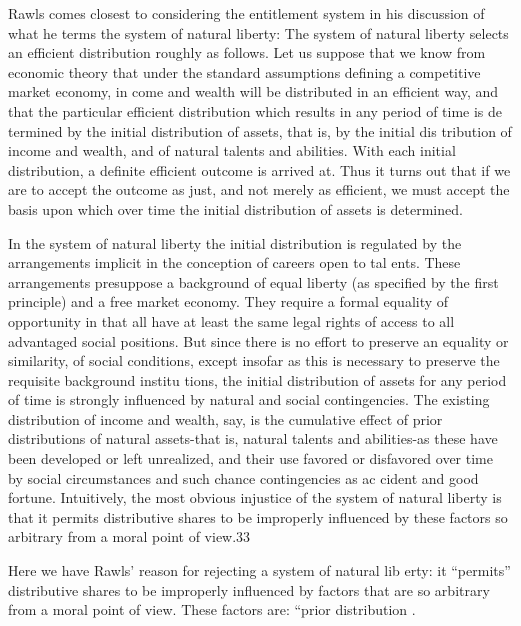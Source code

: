 \documentclass[11pt,openany]{book}
\begin{document}
Rawls comes closest to considering the entitlement system in his discussion of what he terms the system of natural liberty: The system of natural liberty selects an efficient distribution roughly as follows. Let us suppose that we know from economic theory that under the standard assumptions defining a competitive market economy, in come and wealth will be distributed in an efficient way, and that the particular efficient distribution which results in any period of time is de termined by the initial distribution of assets, that is, by the initial dis tribution of income and wealth, and of natural talents and abilities. With each initial distribution, a definite efficient outcome is arrived at. Thus it turns out that if we are to accept the outcome as just, and not merely as efficient, we must accept the basis upon which over time the initial distribution of assets is determined. 

In the system of natural liberty the initial distribution is regulated by the arrangements implicit in the conception of careers open to tal ents. These arrangements presuppose a background of equal liberty (as specified by the first principle) and a free market economy. They require a formal equality of opportunity in that all have at least the same legal rights of access to all advantaged social positions. But since there is no effort to preserve an equality or similarity, of social conditions, except insofar as this is necessary to preserve the requisite background institu tions, the initial distribution of assets for any period of time is strongly influenced by natural and social contingencies. The existing distribution of income and wealth, say, is the cumulative effect of prior distributions of natural assets-that is, natural talents and abilities-as these have been developed or left unrealized, and their use favored or disfavored over time by social circumstances and such chance contingencies as ac cident and good fortune. Intuitively, the most obvious injustice of the system of natural liberty is that it permits distributive shares to be improperly influenced by these factors so arbitrary from a moral point of view.33 

Here we have Rawls' reason for rejecting a system of natural lib erty: it ``permits'' distributive shares to be improperly influenced by factors that are so arbitrary from a moral point of view. These factors are: ``prior distribution . 
\end{document}
